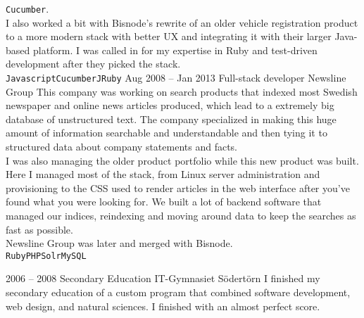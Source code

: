 \documentclass[9pt]{developercv} %
\begin{document}
\begin{entrylist}
{      \texttt{Cucumber}.\\ I also worked a bit with Bisnode's rewrite of an
      older vehicle registration product to a more modern stack with better
      UX and integrating it with their larger Java-based platform. I was called
      in for my expertise in Ruby and test-driven development after they picked
      the stack.\\
      \texttt{Javascript}\slashsep\texttt{Cucumber}\slashsep\texttt{JRuby}}
  \entry
    {Aug 2008 -- Jan 2013}
    {Full-stack developer}
    {Newsline Group}
    {This company was working on search products that indexed most Swedish
      newspaper and online news articles produced, which lead to a extremely
      big database of unstructured text. The company specialized in making this
      huge amount of information searchable and understandable and then tying
      it to structured data about company statements and facts.\\ I was also
      managing the older product portfolio while this new product was built.\\
      Here I managed most of the stack, from Linux server administration and
      provisioning to the CSS used to render articles in the web interface
      after you've found what you were looking for. We built a lot of backend
      software that managed our indices, reindexing and moving around data to
      keep the searches as fast as possible.\\ Newsline Group was later and
      merged with Bisnode.\\
      \texttt{Ruby}\slashsep\texttt{PHP}\slashsep\texttt{Solr}\slashsep\texttt{MySQL}}
\end{entrylist}



\begin{entrylist}
  \entry
    {2006 -- 2008}
    {Secondary Education}
    {IT-Gymnasiet Södertörn}
    {I finished my secondary education of a custom program that combined
      software development, web design, and natural sciences. I finished with
      an almost perfect score.}
\end{entrylist}

\end{document}
